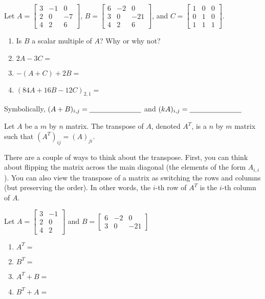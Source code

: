 \bq Let $A=\begin{bmatrix} 3&-1&0 \\2&0&-7 \\ 4&2&6 \end{bmatrix}$, $B=\begin{bmatrix} 6&-2&0 \\3&0&-21 \\ 4&2&6 \end{bmatrix}$, and \break$C=\begin{bmatrix} 1&0&0 \\0&1&0\\1&1&1 \end{bmatrix}$.
\begin{enumerate}
\item Is $B$ a scalar multiple of $A$? Why or why not?
\item $2A-3C=$
\item $-(A+C)+2B=$
\item $(84A+16B-12C)_{2,1}=$
\end{enumerate}
\eq
\bq Symbolically, $(A+B)_{i,j}=\underline{\hspace{1.0in}}$ and \break$(k A)_{i,j}=\underline{\hspace{1.0in}}$
\eq
\begin{definition}
Let $A$ be a $m$ by $n$ matrix. The transpose of $A$, denoted $A^T$, is a $n$ by $m$ matrix such that $(A^T)_{ij}= (A)_{ji}$.
\end{definition}
There are a couple of ways to think about the transpose. First, you can think about flipping the matrix across the main diagonal (the elements of the form $A_{i,i}$). You can also view the transpose of a matrix as switching the rows and columns (but preserving the order). In other words, the $i$-th row of $A^T$ is the $i$-th column of $A$.

\bq Let $A=\begin{bmatrix} 3&-1 \\2&0 \\ 4&2 \end{bmatrix}$ and $B=\begin{bmatrix} 6&-2&0 \\3&0&-21 \end{bmatrix}$
\begin{enumerate}
\item $A^T=$
\item $B^T=$
\item $A^T+B=$
\item $B^T+A=$
\end{enumerate}
\eq

